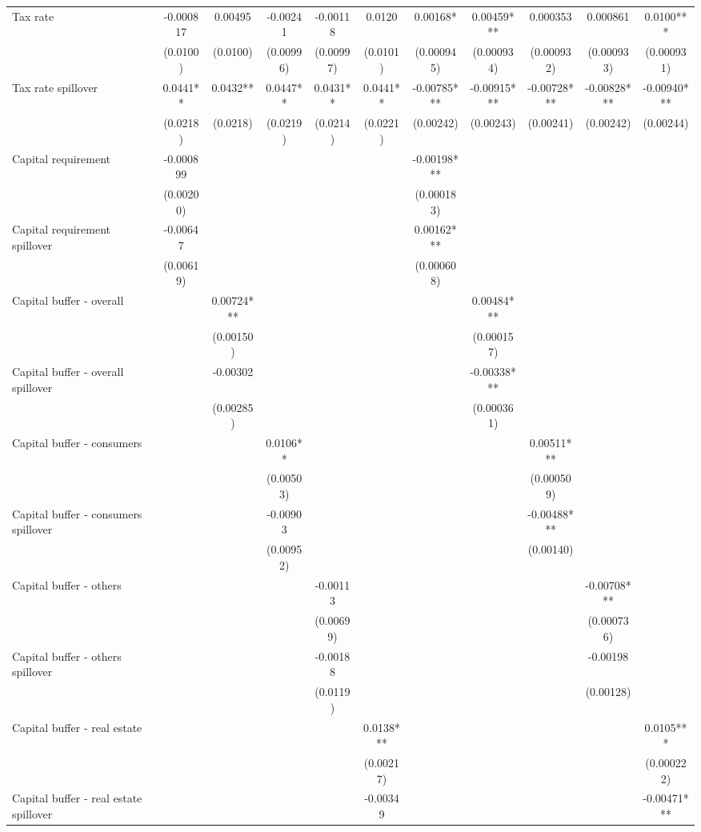 \begin{tabular}{lcccccccccc}
Tax rate & -0.000817 & 0.00495 & -0.00241 & -0.00118 & 0.0120 & 0.00168* & 0.00459*** & 0.000353 & 0.000861 & 0.0100*** \\
 & (0.0100) & (0.0100) & (0.00996) & (0.00997) & (0.0101) & (0.000945) & (0.000934) & (0.000932) & (0.000933) & (0.000931) \\
Tax rate spillover & 0.0441** & 0.0432** & 0.0447** & 0.0431** & 0.0441** & -0.00785*** & -0.00915*** & -0.00728*** & -0.00828*** & -0.00940*** \\
 & (0.0218) & (0.0218) & (0.0219) & (0.0214) & (0.0221) & (0.00242) & (0.00243) & (0.00241) & (0.00242) & (0.00244) \\
Capital requirement & -0.000899 &  &  &  &  & -0.00198*** &  &  &  &  \\
 & (0.00200) &  &  &  &  & (0.000183) &  &  &  &  \\
Capital requirement spillover & -0.00647 &  &  &  &  & 0.00162*** &  &  &  &  \\
 & (0.00619) &  &  &  &  & (0.000608) &  &  &  &  \\
Capital buffer - overall &  & 0.00724*** &  &  &  &  & 0.00484*** &  &  &  \\
 &  & (0.00150) &  &  &  &  & (0.000157) &  &  &  \\
Capital buffer - overall spillover &  & -0.00302 &  &  &  &  & -0.00338*** &  &  &  \\
 &  & (0.00285) &  &  &  &  & (0.000361) &  &  &  \\
Capital buffer - consumers &  &  & 0.0106** &  &  &  &  & 0.00511*** &  &  \\
 &  &  & (0.00503) &  &  &  &  & (0.000509) &  &  \\
Capital buffer - consumers spillover &  &  & -0.00903 &  &  &  &  & -0.00488*** &  &  \\
 &  &  & (0.00952) &  &  &  &  & (0.00140) &  &  \\
Capital buffer - others &  &  &  & -0.00113 &  &  &  &  & -0.00708*** &  \\
 &  &  &  & (0.00699) &  &  &  &  & (0.000736) &  \\
Capital buffer - others spillover &  &  &  & -0.00188 &  &  &  &  & -0.00198 &  \\
 &  &  &  & (0.0119) &  &  &  &  & (0.00128) &  \\
Capital buffer - real estate &  &  &  &  & 0.0138*** &  &  &  &  & 0.0105*** \\
 &  &  &  &  & (0.00217) &  &  &  &  & (0.000222) \\
Capital buffer - real estate spillover &  &  &  &  & -0.00349 &  &  &  &  & -0.00471*** \\

\end{tabular}
